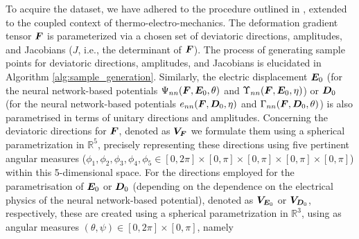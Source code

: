 To acquire the dataset, we have adhered to the procedure outlined in \cite{OKunc_19_01}, extended to the coupled context of thermo-electro-mechanics. The deformation gradient tensor $\boldsymbol{F}$ is parameterized via a  chosen set of deviatoric directions, amplitudes, and Jacobians ($J$, i.e., the determinant of $\boldsymbol{F}$). The process of generating sample points for deviatoric directions, amplitudes, and Jacobians is elucidated in Algorithm \ref{alg:sample_generation}. Similarly, the electric displacement $\boldsymbol{E}_0$ (for the neural network-based potentials $\Psi_{nn}(\boldsymbol{F},\boldsymbol{E}_0,\theta)$ and $\Upsilon_{nn}(\boldsymbol{F},\boldsymbol{E}_0,\eta)$) or $\boldsymbol{D}_0$ (for the neural network-based potentials $e_{nn}(\boldsymbol{F},\boldsymbol{D}_0,\eta)$ and $\Gamma_{nn}(\boldsymbol{F},\boldsymbol{D}_0,\theta)$) is also parametrised in terms of unitary directions and amplitudes.
Concerning the deviatoric directions for $\boldsymbol{F}$, denoted as $\boldsymbol{V_F}$ we formulate them using a spherical parametrization in $\mathbb{R}^5$, precisely representing these directions using five pertinent angular measures ($\phi_1, \phi_2, \phi_3, \phi_4, \phi_5\in[0,2\pi]\times[0,\pi]\times[0,\pi]\times[0,\pi]\times[0,\pi]$) within this 5-dimensional space.  For the directions employed for the parametrisation of $\boldsymbol{E}_0$  or $\boldsymbol{D}_0$ (depending on the dependence on the electrical physics of the neural network-based potential), denoted as $\boldsymbol{V}_{\boldsymbol{E}_0}$ or $\boldsymbol{V}_{\boldsymbol{D}_0}$, respectively, these are created using a spherical parametrization in $\mathbb{R}^3$, using as angular measures $(\theta,\psi)\in[0,2\pi]\times[0,\pi]$, namely
%
%

